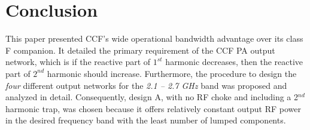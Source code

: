 \documentclass[conference]{IEEEtran}
\begin{document}
\section{Conclusion}
\label{section:Conclusion}
This paper presented CCF's wide operational bandwidth advantage over its class F companion. It detailed the primary requirement of the CCF PA output network, which is if the reactive part of $1^{st}$ harmonic decreases, then the reactive part of $2^{nd}$ harmonic should increase. Furthermore, the procedure to design the \textit{four} different output networks for the \textit{2.1 -- 2.7 GHz} band was proposed and analyzed in detail.  Consequently, design A, with no RF choke and  including a 2$^{nd}$ harmonic trap, was chosen because it offers relatively constant output RF power in the desired frequency band with the least number of lumped components.



\end{document}
